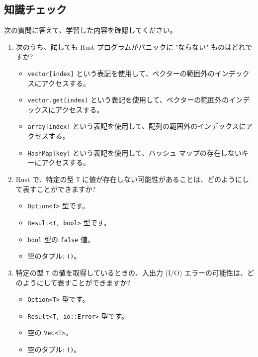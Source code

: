 \subsection{知識チェック}

次の質問に答えて、学習した内容を確認してください。

\begin{enumerate}

\item 次のうち、試しても Rust プログラムがパニックに "ならない" ものはどれですか?

\begin{itemize}
\item \texttt{vector[index]} という表記を使用して、ベクターの範囲外のインデックスにアクセスする。
\item \texttt{vector.get(index)} という表記を使用して、ベクターの範囲外のインデックスにアクセスする。
\item \texttt{array[index]} という表記を使用して、配列の範囲外のインデックスにアクセスする。
\item \texttt{HashMap[key]} という表記を使用して、ハッシュ マップの存在しないキーにアクセスする。
\end{itemize}

\item Rust で、特定の型 \texttt{T} に値が存在しない可能性があることは、どのようにして表すことができますか?

\begin{itemize}
\item \texttt{Option<T>} 型です。
\item \texttt{Result<T, bool>} 型です。
\item \texttt{bool} 型の \texttt{false} 値。
\item 空のタプル: \texttt{()}。
\end{itemize}

\item 特定の型 \texttt{T} の値を取得しているときの、入出力 (I/O) エラーの可能性は、どのようにして表すことができますか?

\begin{itemize}
\item \texttt{Option<T>} 型です。
\item \texttt{Result<T, io::Error>} 型です。
\item 空の \texttt{Vec<T>}。
\item 空のタプル: \texttt{()}。
\end{itemize}

\end{enumerate}

